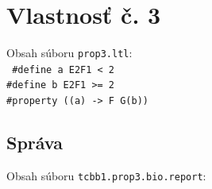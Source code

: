\documentclass[11pt,final,oneside]{fithesis}
\begin{document}
\chapter{Vlastnos\v t \v c. 3}
\label{sec:caseProp3File}
Obsah s\'uboru {\tt prop3.ltl}:\\

{\tt
\noindent
\#define a E2F1 < 2\\
\#define b E2F1 >= 2\\

\noindent
\#property ((a) -> F G(b))\\

}

\section{Spr\'ava}
\label{sec:prop3report}
Obsah s\'uboru {\tt tcbb1.prop3.bio.report}:\\
\end{document}

